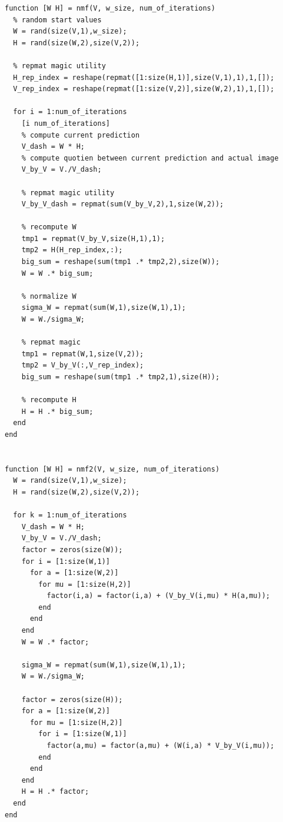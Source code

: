 \documentclass{article}
\begin{document}
\begin{lstlisting}
function [W H] = nmf(V, w_size, num_of_iterations)
  % random start values
  W = rand(size(V,1),w_size);
  H = rand(size(W,2),size(V,2));

  % repmat magic utility
  H_rep_index = reshape(repmat([1:size(H,1)],size(V,1),1),1,[]);
  V_rep_index = reshape(repmat([1:size(V,2)],size(W,2),1),1,[]);
  
  for i = 1:num_of_iterations
    [i num_of_iterations]
    % compute current prediction
    V_dash = W * H;
    % compute quotien between current prediction and actual image
    V_by_V = V./V_dash;

    % repmat magic utility
    V_by_V_dash = repmat(sum(V_by_V,2),1,size(W,2));
    
    % recompute W
    tmp1 = repmat(V_by_V,size(H,1),1);
    tmp2 = H(H_rep_index,:);
    big_sum = reshape(sum(tmp1 .* tmp2,2),size(W));
    W = W .* big_sum;
    
    % normalize W
    sigma_W = repmat(sum(W,1),size(W,1),1);
    W = W./sigma_W;

    % repmat magic
    tmp1 = repmat(W,1,size(V,2));
    tmp2 = V_by_V(:,V_rep_index);
    big_sum = reshape(sum(tmp1 .* tmp2,1),size(H));

    % recompute H
    H = H .* big_sum;
  end
end


function [W H] = nmf2(V, w_size, num_of_iterations)
  W = rand(size(V,1),w_size);
  H = rand(size(W,2),size(V,2));
  
  for k = 1:num_of_iterations
    V_dash = W * H;
    V_by_V = V./V_dash;
    factor = zeros(size(W));
    for i = [1:size(W,1)]
      for a = [1:size(W,2)]
        for mu = [1:size(H,2)]
          factor(i,a) = factor(i,a) + (V_by_V(i,mu) * H(a,mu));
        end
      end
    end
    W = W .* factor;
    
    sigma_W = repmat(sum(W,1),size(W,1),1);
    W = W./sigma_W;

    factor = zeros(size(H));
    for a = [1:size(W,2)]
      for mu = [1:size(H,2)]
        for i = [1:size(W,1)]
          factor(a,mu) = factor(a,mu) + (W(i,a) * V_by_V(i,mu));
        end
      end
    end
    H = H .* factor;
  end
end
\end{lstlisting}
\newpage
\end{document}
